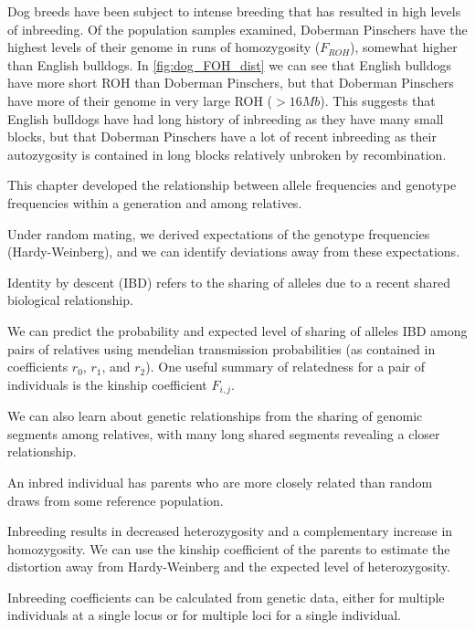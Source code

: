 {{Dog breeds have been subject
to intense breeding that has resulted in high levels of inbreeding. Of the population samples examined, Doberman Pinschers have the highest levels of their genome in runs of
homozygosity ($F_{ROH}$), somewhat higher than English bulldogs. In
\ref{fig:dog_FOH_dist} we can see that English bulldogs have more
short ROH than Doberman Pinschers, but that Doberman Pinschers have
more of their genome in very large ROH ($>16 Mb$). This suggests that
English bulldogs have had long history of inbreeding as they have many
small blocks, but that Doberman Pinschers have a lot of recent
inbreeding as their autozygosity is contained in long blocks
relatively unbroken by recombination.


\begin{ChapterSummary}
\item This chapter developed the relationship between allele
  frequencies and genotype frequencies within a generation and among
  relatives. 
 \item Under random mating, we derived expectations of the genotype
   frequencies (Hardy-Weinberg), and we can identify deviations away from these
   expectations.
\item Identity by descent (IBD) refers to the sharing of alleles due to a
  recent shared biological relationship. 
\item We can predict the probability and expected level of sharing of
  alleles IBD among pairs of relatives using mendelian transmission
  probabilities (as contained in coefficients $r_0$, $r_1$, and $r_2$). One useful summary of
  relatedness for a pair of individuals is the kinship coefficient
  $F_{i,j}$.
 \item  We can also learn about genetic relationships from the sharing
   of genomic segments among relatives, with many long shared segments revealing a closer relationship.
 \item An inbred individual has parents who are more closely related than random draws from some reference population. 
\item Inbreeding results in decreased heterozygosity and a complementary increase in homozygosity. We can use the kinship
  coefficient of the parents to estimate the distortion away from
  Hardy-Weinberg and the expected level of heterozygosity. 
\item Inbreeding coefficients can be calculated from genetic data,
  either for multiple individuals at a single locus or for multiple loci for
  a single individual. 
\end{ChapterSummary}

}}
